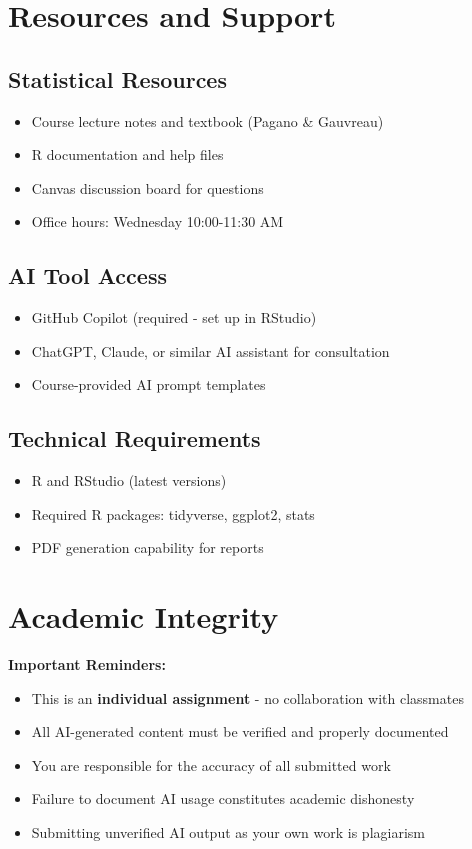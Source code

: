 \documentclass[11pt]{article}
\begin{document}
\section{Resources and Support}

\subsection{Statistical Resources}
\begin{itemize}
\item Course lecture notes and textbook (Pagano \& Gauvreau)
\item R documentation and help files
\item Canvas discussion board for questions
\item Office hours: Wednesday 10:00-11:30 AM
\end{itemize}

\subsection{AI Tool Access}
\begin{itemize}
\item GitHub Copilot (required - set up in RStudio)
\item ChatGPT, Claude, or similar AI assistant for consultation
\item Course-provided AI prompt templates
\end{itemize}

\subsection{Technical Requirements}
\begin{itemize}
\item R and RStudio (latest versions)
\item Required R packages: tidyverse, ggplot2, stats
\item PDF generation capability for reports
\end{itemize}

\section{Academic Integrity}

\begin{tcolorbox}[colback=red!5,colframe=red,boxrule=1pt,arc=2pt,left=6pt,right=6pt,top=6pt,bottom=6pt]
\textbf{Important Reminders:}
\begin{itemize}
\item This is an \textbf{individual assignment} - no collaboration with classmates
\item All AI-generated content must be verified and properly documented
\item You are responsible for the accuracy of all submitted work
\item Failure to document AI usage constitutes academic dishonesty
\item Submitting unverified AI output as your own work is plagiarism
\end{itemize}
\end{tcolorbox}
\end{document}
